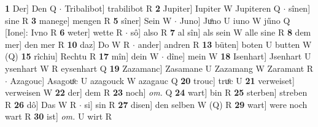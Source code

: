 \documentclass[8pt,a4paper,notitlepage]{article}
\begin{document}
\begin{table}[ht]
\begin{minipage}[t]{0.5\linewidth}
\textbf{1} Der] Den Q  $\cdot$ Tribalibot] trabilibot R \textbf{2} Jupiter] Iupiter W Jupiteren Q  $\cdot$ sînen] sine R \textbf{3} manege] mengen R \textbf{5} sîner] Sein W  $\cdot$ Juno] Juͦno U iuno W jűno Q [Ione]: Ivno R \textbf{6} weter] wette R  $\cdot$ sô] also R \textbf{7} al sîn] als sein W alle sine R \textbf{8} dem mer] den mer R \textbf{10} daz] Do W R  $\cdot$ ander] andren R \textbf{13} büten] boten U butten W (Q) \textbf{15} rîchiu] Rechtu R \textbf{17} mîn] dein W  $\cdot$ dîne] mein W \textbf{18} Isenhart] Jsenhart U ysenhart W R eysenhart Q \textbf{19} Zazamanc] Zasamane U Zazamang W Zaramant R  $\cdot$ Azagouc] Asagouͦc U azagouck W azagauc Q \textbf{20} trouc] truͦc U \textbf{21} verweiset] verweisen W \textbf{22} der] dem R \textbf{23} noch] \textit{om.} Q \textbf{24} wart] bin R \textbf{25} sterben] streben R \textbf{26} dô] Das W R  $\cdot$ si] sin R \textbf{27} disen] den selben W (Q) R \textbf{29} wart] were noch wart R \textbf{30} ist] \textit{om.} U wirt R \newline
\end{minipage}
\end{table}
\end{document}
